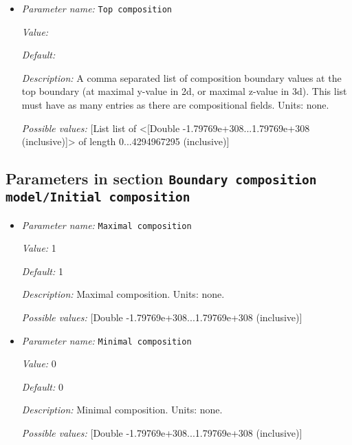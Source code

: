 \begin{itemize}
{\it Possible values:} [List list of <[Double -1.79769e+308...1.79769e+308 (inclusive)]> of length 0...4294967295 (inclusive)]
\item {\it Parameter name:} {\tt Top composition}
\label{parameters:Boundary composition model/Box with lithosphere boundary indicators/Top composition}


{\it Value:} 


{\it Default:} 


{\it Description:} A comma separated list of composition boundary values at the top boundary (at maximal y-value in 2d, or maximal z-value in 3d). This list must have as many entries as there are compositional fields. Units: none.


{\it Possible values:} [List list of <[Double -1.79769e+308...1.79769e+308 (inclusive)]> of length 0...4294967295 (inclusive)]
\end{itemize}

\subsection{Parameters in section \tt Boundary composition model/Initial composition}
\label{parameters:Boundary_20composition_20model/Initial_20composition}

\begin{itemize}
\item {\it Parameter name:} {\tt Maximal composition}
\label{parameters:Boundary composition model/Initial composition/Maximal composition}


{\it Value:} 1


{\it Default:} 1


{\it Description:} Maximal composition. Units: none.


{\it Possible values:} [Double -1.79769e+308...1.79769e+308 (inclusive)]
\item {\it Parameter name:} {\tt Minimal composition}
\label{parameters:Boundary composition model/Initial composition/Minimal composition}


{\it Value:} 0


{\it Default:} 0


{\it Description:} Minimal composition. Units: none.


{\it Possible values:} [Double -1.79769e+308...1.79769e+308 (inclusive)]
\end{itemize}

